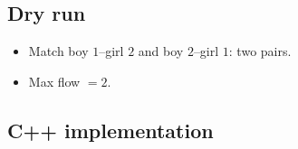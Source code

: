 \subsection*{Dry run}


\begin{itemize}
  \item Match boy $1$--girl $2$ and boy $2$--girl $1$: two pairs.
  \item Max flow $=2$.
\end{itemize}

\subsection*{C++ implementation}

